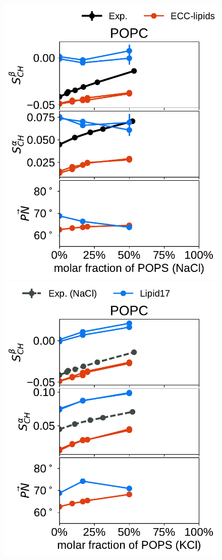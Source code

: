 \documentclass[journal=jpcbfk,manuscript=article]{achemso}
\newlength{\figheightsmall}
\newlength{\figheight}
\begin{document}
\begin{figure}[!tbp] 
  \centering 
  \includegraphics[height=\figheightsmall]{../Fig/order_parameters_changes_A-B_PC-PS_mix_POPC_nacl.pdf} 
  \includegraphics[height=\figheightsmall]{../Fig/order_parameters_changes_A-B_PC-PS_mix_POPC_kcl.pdf} 

\end{figure}
\end{document}

